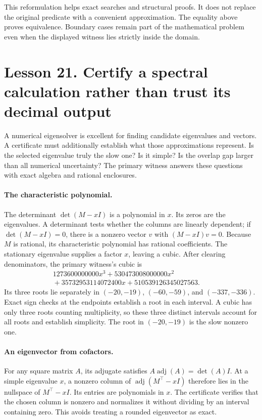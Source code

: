 This reformulation helps exact searches and structural proofs. It does not
replace the original predicate with a convenient approximation. The equality
above proves equivalence. Boundary cases remain part of the mathematical
problem even when the displayed witness lies strictly inside the domain.

\clearpage
\section*{Lesson 21. Certify a spectral calculation rather than trust its decimal output}
A numerical eigensolver is excellent for finding candidate eigenvalues and
vectors. A certificate must additionally establish what those approximations
represent. Is the selected eigenvalue truly the slow one? Is it simple? Is
the overlap gap larger than all numerical uncertainty? The primary witness
answers these questions with exact algebra and rational enclosures.

\paragraph{The characteristic polynomial.}
The determinant $\det(M-xI)$ is a polynomial in $x$. Its zeros are the
eigenvalues. A determinant tests whether the columns are linearly dependent;
if $\det(M-xI)=0$, there is a nonzero vector $v$ with $(M-xI)v=0$.
Because $M$ is rational, its characteristic polynomial has rational
coefficients. The stationary eigenvalue supplies a factor $x$, leaving a
cubic. After clearing denominators, the primary witness's cubic is
\[
\begin{split}
1273600000000x^3+530473008000000x^2\qquad\qquad\quad\\
{}+35732953114072400x+510539126345027563.
\end{split}
\]
Its three roots lie separately in $(-20,-19)$, $(-60,-59)$, and
$(-337,-336)$. Exact sign checks at the endpoints establish a root in each
interval. A cubic has only three roots counting multiplicity, so these
three distinct intervals account for all roots and establish simplicity.
The root in $(-20,-19)$ is the slow nonzero one.

\paragraph{An eigenvector from cofactors.}
For any square matrix $A$, its adjugate satisfies
$A\operatorname{adj}(A)=\det(A)I$. At a simple eigenvalue $x$, a nonzero
column of $\operatorname{adj}(M^\top-xI)$ therefore lies in the nullspace
of $M^\top-xI$. Its entries are polynomials in $x$. The certificate verifies
that the chosen column is nonzero and normalizes it without dividing by an
interval containing zero. This avoids treating a rounded eigenvector as exact.

